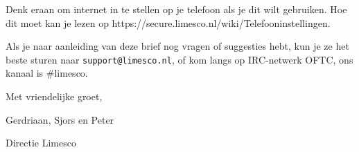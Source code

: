 \documentclass[a4paper,11pt]{memoir}
\begin{document}
Denk eraan om internet in te stellen op je telefoon als je dit wilt gebruiken. Hoe dit moet kan je lezen op https://secure.limesco.nl/wiki/Telefooninstellingen.

Als je naar aanleiding van deze brief nog vragen of suggesties hebt, kun je ze
het beste sturen naar \texttt{support@limesco.nl}, of kom langs op IRC-netwerk
OFTC, ons kanaal is \#limesco.

Met vriendelijke groet,

Gerdriaan, Sjors en Peter

Directie Limesco
\end{document}

